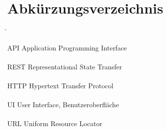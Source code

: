 \section*{Abkürzungsverzeichnis}
\label{abk:Abkuerzungsverzeichnis}
\begin{tabbing}
\hspace*{3,5cm}\=\kill

API \> Application Programming Interface\\ \\

REST \> Representational State Transfer\\ \\

HTTP \> Hypertext Transfer Protocol\\ \\

UI \> User Interface, Benutzeroberfläche\\ \\

URL \> Uniform Resource Locator\\ \\
\end{tabbing}
